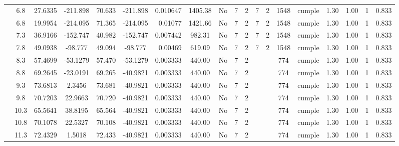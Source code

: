 \begin{table}[H]
{\begin{tabular}{|c|c|c|c|c|c|r|c|c|c|c|c|c|c|c|c|c|c|c|}
\cline{2-19}        & \cellcolor[rgb]{ .851,  .882,  .949}6.8 & 27.6335 & -211.898 & 70.633 & -211.898 & 0.010647 & 1405.38 & No  & 7   & 2   & 7   & 2   & 1548 & \cellcolor[rgb]{ .776,  .937,  .808}cumple & 1.30 & 1.00 & 1   & 0.833 \bigstrut\\
\cline{2-19}        & \cellcolor[rgb]{ .851,  .882,  .949}6.8 & 19.9954 & -214.095 & 71.365 & -214.095 & 0.01077 & 1421.66 & No  & 7   & 2   & 7   & 2   & 1548 & \cellcolor[rgb]{ .776,  .937,  .808}cumple & 1.30 & 1.00 & 1   & 0.833 \bigstrut\\
\cline{2-19}        & 7.3 & 36.9166 & -152.747 & 40.982 & -152.747 & 0.007442 & 982.31 & No  & 7   & 2   & 7   & 2   & 1548 & \cellcolor[rgb]{ .776,  .937,  .808}cumple & 1.30 & 1.00 & 1   & 0.833 \bigstrut\\
\cline{2-19}        & 7.8 & 49.0938 & -98.777 & 49.094 & -98.777 & 0.00469 & 619.09 & No  & 7   & 2   & 7   & 2   & 1548 & \cellcolor[rgb]{ .776,  .937,  .808}cumple & 1.30 & 1.00 & 1   & 0.833 \bigstrut\\
\cline{2-19}        & 8.3 & 57.4699 & -53.1279 & 57.470 & -53.1279 & 0.003333 & 440.00 & No  & 7   & 2   &     &     & 774 & \cellcolor[rgb]{ .776,  .937,  .808}cumple & 1.30 & 1.00 & 1   & 0.833 \bigstrut\\
\cline{2-19}        & 8.8 & 69.2645 & -23.0191 & 69.265 & -40.9821 & 0.003333 & 440.00 & No  & 7   & 2   &     &     & 774 & \cellcolor[rgb]{ .776,  .937,  .808}cumple & 1.30 & 1.00 & 1   & 0.833 \bigstrut\\
\cline{2-19}        & 9.3 & 73.6813 & 2.3456 & 73.681 & -40.9821 & 0.003333 & 440.00 & No  & 7   & 2   &     &     & 774 & \cellcolor[rgb]{ .776,  .937,  .808}cumple & 1.30 & 1.00 & 1   & 0.833 \bigstrut\\
\cline{2-19}        & 9.8 & 70.7203 & 22.9663 & 70.720 & -40.9821 & 0.003333 & 440.00 & No  & 7   & 2   &     &     & 774 & \cellcolor[rgb]{ .776,  .937,  .808}cumple & 1.30 & 1.00 & 1   & 0.833 \bigstrut\\
\cline{2-19}        & 10.3 & 65.5641 & 38.8195 & 65.564 & -40.9821 & 0.003333 & 440.00 & No  & 7   & 2   &     &     & 774 & \cellcolor[rgb]{ .776,  .937,  .808}cumple & 1.30 & 1.00 & 1   & 0.833 \bigstrut\\
\cline{2-19}        & 10.8 & 70.1078 & 22.5327 & 70.108 & -40.9821 & 0.003333 & 440.00 & No  & 7   & 2   &     &     & 774 & \cellcolor[rgb]{ .776,  .937,  .808}cumple & 1.30 & 1.00 & 1   & 0.833 \bigstrut\\
\cline{2-19}        & 11.3 & 72.4329 & 1.5018 & 72.433 & -40.9821 & 0.003333 & 440.00 & No  & 7   & 2   &     &     & 774 & \cellcolor[rgb]{ .776,  .937,  .808}cumple & 1.30 & 1.00 & 1   & 0.833 \bigstrut\\

\end{tabular}}
\end{table}
